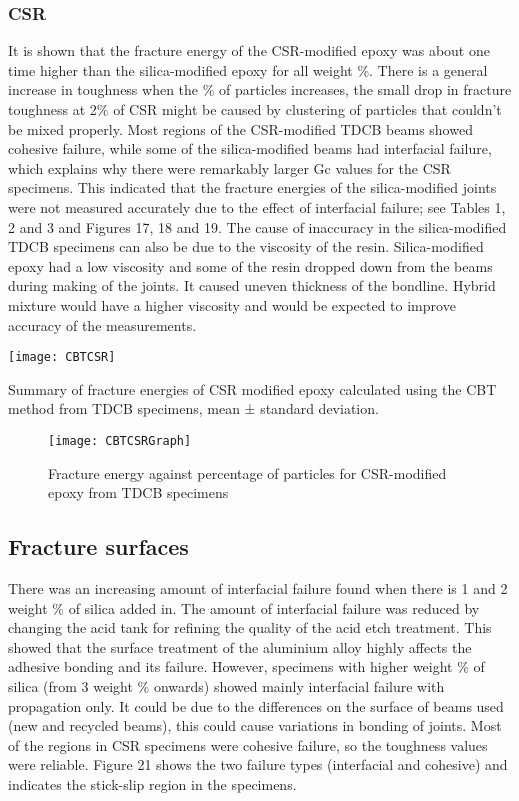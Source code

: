 \documentclass[numbers=noendperiod,chapterprefix=on]{icldt} %
\begin{document}
\subsubsection{CSR}
It is shown that the fracture energy of the CSR-modified epoxy was about one time higher than the silica-modified epoxy for all weight \%. There is a general increase in toughness when the \% of particles increases, the small drop in fracture toughness at 2\% of CSR might be caused by clustering of particles that couldn’t be mixed properly. Most regions of the CSR-modified TDCB beams showed cohesive failure, while some of the silica-modified beams had interfacial failure, which explains why there were remarkably larger Gc values for the CSR specimens. This indicated that the fracture energies of the silica-modified joints were not measured accurately due to the effect of interfacial failure; see Tables 1, 2 and 3 and Figures 17, 18 and 19.
The cause of inaccuracy in the silica-modified TDCB specimens can also be due to the viscosity of the resin. Silica-modified epoxy had a low viscosity and some of the resin dropped down from the beams during making of the joints. It caused uneven thickness of the bondline. Hybrid mixture would have a higher viscosity and would be expected to improve accuracy of the measurements.

\begin{table}[!htpb]
\centering
\texttt{[image: CBTCSR]}
\caption{Summary of fracture energies of CSR modified epoxy calculated using the CBT method from TDCB specimens, mean ± standard deviation. } %
\end{table}
\FloatBarrier
\begin{figure}[!htpb]
\centering
\texttt{[image: CBTCSRGraph]}
\caption{Fracture energy against percentage of particles for CSR-modified epoxy from TDCB specimens} %
\end{figure}
\FloatBarrier
\subsection{Fracture surfaces}
There was an increasing amount of interfacial failure found when there is 1 and 2 weight \% of silica added in. The amount of interfacial failure was reduced by changing the acid tank for refining the quality of the acid etch treatment. This showed that the surface treatment of the aluminium alloy highly affects the adhesive bonding and its failure. However, specimens with higher weight \% of silica (from 3 weight \% onwards) showed mainly interfacial failure with propagation only. It could be due to the differences on the surface of beams used (new and recycled beams), this could cause variations in bonding of joints. Most of the regions in CSR specimens were cohesive failure, so the toughness values were reliable. Figure 21 shows the two failure types (interfacial and cohesive) and indicates the stick-slip region in the specimens. 
\end{document}
